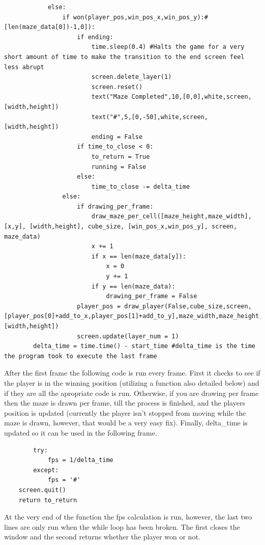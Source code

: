 \clearpage
\begin{lstlisting}
            else:
                if won(player_pos,win_pos_x,win_pos_y):#[len(maze_data[0])-1,0]):
                    if ending:
                        time.sleep(0.4) #Halts the game for a very short amount of time to make the transition to the end screen feel less abrupt
                        screen.delete_layer(1) 
                        screen.reset()                    
                        text("Maze Completed",10,[0,0],white,screen,[width,height])
                        text("#",5,[0,-50],white,screen,[width,height])
                        ending = False
                    if time_to_close < 0:
                        to_return = True
                        running = False
                    else:
                        time_to_close -= delta_time
                else:
                    if drawing_per_frame:
                        draw_maze_per_cell([maze_height,maze_width], [x,y], [width,height], cube_size, [win_pos_x,win_pos_y], screen, maze_data)
                        x += 1
                        if x == len(maze_data[y]):
                            x = 0
                            y += 1
                        if y == len(maze_data):
                            drawing_per_frame = False                  
                    player_pos = draw_player(False,cube_size,screen,[player_pos[0]+add_to_x,player_pos[1]+add_to_y],maze_width,maze_height,[width,height])
                    screen.update(layer_num = 1)
        delta_time = time.time() - start_time #delta_time is the time the program took to execute the last frame
\end{lstlisting}
After the first frame the following code is run every frame. First it checks to see if the player is in the winning position (utilizing a function also detailed below) and if they are all the apropriate code is run. Otherwise, if you are drawing per frame then the maze is drawn per frame, till the process is finished, and the players position is updated (currently the player isn't stopped from moving while the maze is drawn, however, that would be a very easy fix). Finally, delta\_time is updated so it can be used in the following frame.

\begin{lstlisting}
        try:
            fps = 1/delta_time         
        except:
            fps = '#'
    screen.quit()
    return to_return
\end{lstlisting}
At the very end of the function the fps calculation is run, however, the last two lines are only run when the while loop has been broken. The first closes the window and the second returns whether the player won or not.


